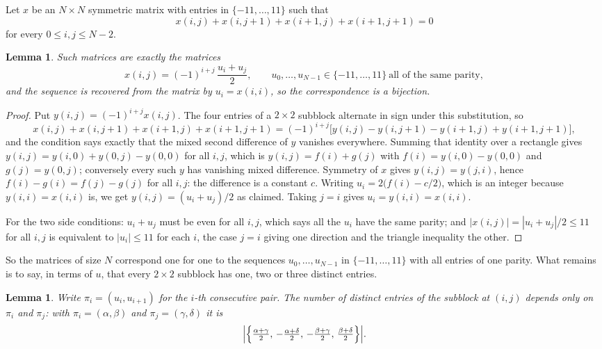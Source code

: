 \documentclass[11pt,a4paper]{article}
\theoremstyle{plain}
\newtheorem{lemma}[theorem]{Lemma}
\theoremstyle{definition}
\begin{document}
Let $x$ be an $N\times N$ symmetric matrix with entries in $\{-11,\dots,11\}$ such that
\[
x(i,j)+x(i,j{+}1)+x(i{+}1,j)+x(i{+}1,j{+}1)=0
\]
for every $0\le i,j\le N-2$.

\begin{lemma}\label{lem:solve}
Such matrices are exactly the matrices
\[
x(i,j)=(-1)^{i+j}\,\frac{u_i+u_j}{2},
\qquad u_0,\dots,u_{N-1}\in\{-11,\dots,11\}\ \text{all of the same parity},
\]
and the sequence is recovered from the matrix by $u_i=x(i,i)$, so the correspondence is a
bijection.
\end{lemma}

\begin{proof}
Put $y(i,j)=(-1)^{i+j}x(i,j)$. The four entries of a $2\times2$ subblock alternate in sign
under this substitution, so
\[
x(i,j)+x(i,j{+}1)+x(i{+}1,j)+x(i{+}1,j{+}1)
=(-1)^{i+j}\bigl[y(i,j)-y(i,j{+}1)-y(i{+}1,j)+y(i{+}1,j{+}1)\bigr],
\]
and the condition says exactly that the mixed second difference of $y$ vanishes everywhere.
Summing that identity over a rectangle gives
$y(i,j)=y(i,0)+y(0,j)-y(0,0)$ for all $i,j$, which is $y(i,j)=f(i)+g(j)$ with
$f(i)=y(i,0)-y(0,0)$ and $g(j)=y(0,j)$; conversely every such $y$ has vanishing mixed
difference. Symmetry of $x$ gives $y(i,j)=y(j,i)$, hence $f(i)-g(i)=f(j)-g(j)$ for all $i,j$:
the difference is a constant $c$. Writing $u_i=2\bigl(f(i)-c/2\bigr)$, which is an integer
because $y(i,i)=x(i,i)$ is, we get $y(i,j)=(u_i+u_j)/2$ as claimed. Taking $j=i$ gives
$u_i=y(i,i)=x(i,i)$.

For the two side conditions: $u_i+u_j$ must be even for all $i,j$, which says all the $u_i$ have
the same parity; and $|x(i,j)|=|u_i+u_j|/2\le11$ for all $i,j$ is equivalent to $|u_i|\le11$
for each $i$, the case $j=i$ giving one direction and the triangle inequality the other.
\end{proof}

So the matrices of size $N$ correspond one for one to the sequences $u_0,\dots,u_{N-1}$ in
$\{-11,\dots,11\}$ with all entries of one parity. What remains is to say, in terms of $u$,
that every $2\times2$ subblock has one, two or three distinct entries.

\begin{lemma}\label{lem:block}
Write $\pi_i=(u_i,u_{i+1})$ for the $i$-th consecutive pair. The number of distinct entries of
the subblock at $(i,j)$ depends only on $\pi_i$ and $\pi_j$: with $\pi_i=(\alpha,\beta)$ and
$\pi_j=(\gamma,\delta)$ it is
\[
\Bigl|\Bigl\{\tfrac{\alpha+\gamma}{2},\,-\tfrac{\alpha+\delta}{2},\,
-\tfrac{\beta+\gamma}{2},\,\tfrac{\beta+\delta}{2}\Bigr\}\Bigr| .
\]
\end{lemma}
\end{document}
